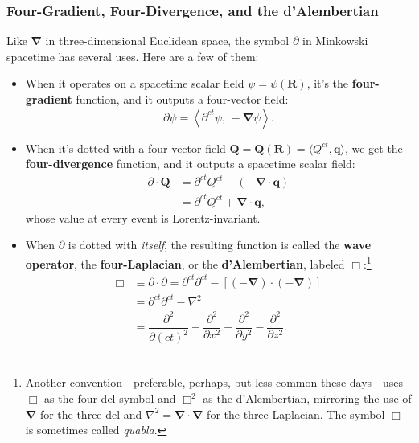 \documentclass[12pt]{article}
\renewcommand{\vv}[1]{\mathbf{#1}}
\newcommand{\del}{\boldsymbol{\nabla}}
\begin{document}
\subsubsection{Four-Gradient, Four-Divergence, and the d'Alembertian}

Like $\del$ in three-dimensional Euclidean space, the symbol $\partialup$ in Minkowski spacetime has several uses. Here are a few of them:
\begin{itemize}
\item{
When it operates on a spacetime scalar field $\psi = \psi (\vv R)$, it's the \textbf{four-gradient} function, and it outputs a four-vector field:
\begin{equation*}
\partialup \psi = \left \langle \partial^{ct} \psi, \, -\del \psi \right \rangle.
\end{equation*}
}
\item{
When it's dotted with a four-vector field $\vv Q = \vv Q (\vv R) = \langle Q^{ct}, \vv q \rangle$, we get the \textbf{four-divergence} function, and it outputs a spacetime scalar field:
\begin{equation*}
\begin{split}
\partialup \cdot \vv Q &= \partial^{ct} Q^{ct} - \left( - \del \cdot \vv q \right) \\
&= \partial^{ct} Q^{ct} + \del \cdot \vv q ,
\end{split}
\end{equation*}
whose value at every event is Lorentz-invariant.
}
\item{
When $\partialup$ is dotted with \emph{itself}, the resulting function is called the \textbf{wave operator}, the \textbf{four-Laplacian}, or the \textbf{d'Alembertian}, labeled $\Box$:\footnote{Another convention---preferable, perhaps, but less common these days---uses $\Box$ as the four-del symbol and $\Box^2$ as the d'Alembertian, mirroring the use of $\del$ for the three-del and $\nabla ^2 = \del \cdot \del$ for the three-Laplacian. The symbol $\Box$ is sometimes called \emph{quabla}.}
\begin{equation*}
\begin{split}
\Box &\equiv \partialup \cdot \partialup = \partial^{ct} \partial^{ct} - \left[ \left( - \del \right) \cdot \left( - \del \right) \right] \\[3pt]
&= \partial^{ct} \partial^{ct} - \nabla ^2 \\[2pt]
&= \dfrac{\partial^2}{\partial (ct)^2} - \dfrac{\partial^2}{\partial x^2} - \dfrac{\partial^2}{\partial y^2} - \dfrac{\partial^2}{\partial z^2} .\\
\end{split}
\end{equation*}
}
\end{itemize}
\end{document}
